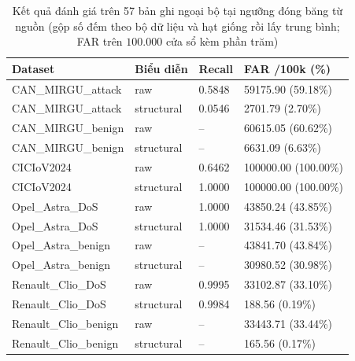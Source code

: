 \documentclass[12pt, a4paper, reqno, oneside]{book}
\begin{document}
{\renewcommand{\arraystretch}{0.85}
\begin{table}[htbp]\centering\footnotesize
\caption[Kết quả đánh giá trên các bộ dữ liệu ngoại bộ tại ngưỡng nguồn]{Kết quả đánh giá trên 57 bản ghi ngoại bộ tại ngưỡng đóng băng từ nguồn (gộp số đếm theo bộ dữ liệu và hạt giống rồi lấy trung bình; FAR trên $100.000$ cửa sổ kèm phần trăm)}\label{tab:extension-external}
\begin{tabular}{P{4.2cm}P{2.8cm}P{1.6cm}P{3.6cm}}
\toprule
Dataset & Biểu diễn & Recall & FAR /100k (\%)\\\midrule
CAN\_MIRGU\_attack & raw & 0.5848 & 59175.90 (59.18\%)\\
CAN\_MIRGU\_attack & structural & 0.0546 & 2701.79 (2.70\%)\\
CAN\_MIRGU\_benign & raw & -- & 60615.05 (60.62\%)\\
CAN\_MIRGU\_benign & structural & -- & 6631.09 (6.63\%)\\
CICIoV2024 & raw & 0.6462 & 100000.00 (100.00\%)\\
CICIoV2024 & structural & 1.0000 & 100000.00 (100.00\%)\\
Opel\_Astra\_DoS & raw & 1.0000 & 43850.24 (43.85\%)\\
Opel\_Astra\_DoS & structural & 1.0000 & 31534.46 (31.53\%)\\
Opel\_Astra\_benign & raw & -- & 43841.70 (43.84\%)\\
Opel\_Astra\_benign & structural & -- & 30980.52 (30.98\%)\\
Renault\_Clio\_DoS & raw & 0.9995 & 33102.87 (33.10\%)\\
Renault\_Clio\_DoS & structural & 0.9984 & 188.56 (0.19\%)\\
Renault\_Clio\_benign & raw & -- & 33443.71 (33.44\%)\\
Renault\_Clio\_benign & structural & -- & 165.56 (0.17\%)\\
\bottomrule\end{tabular}
\end{table}}
\end{document}
